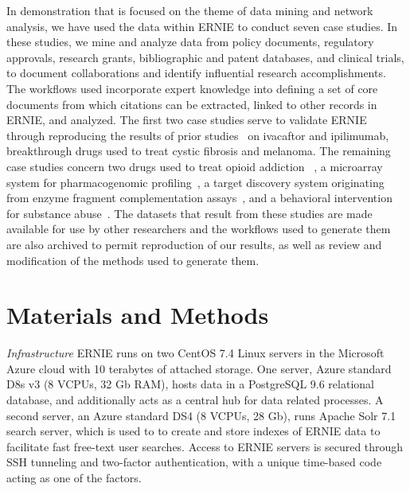 \documentclass[review]{elsarticle}
\begin{document}
In demonstration that is focused on the theme of data mining and network analysis, we have used the data within ERNIE to conduct seven case studies. In these studies, we mine and analyze data from policy documents, regulatory approvals, research grants, bibliographic and patent databases, and clinical trials, to document collaborations and identify influential research accomplishments. The workflows used incorporate expert knowledge into defining a set of core documents from which citations can be extracted, linked to other records in ERNIE, and analyzed. The first two case studies serve to validate ERNIE through reproducing the results of prior studies~\cite{Williams2015} on ivacaftor and ipilimumab, breakthrough drugs used to treat cystic fibrosis and melanoma. The remaining case studies concern two drugs used to treat opioid addiction~\cite{Blumberg1973,Cowan1977} , a microarray system for pharmacogenomic profiling~\cite{deLeon2006}, a target discovery system originating from enzyme fragment complementation assays~\cite{Khanna1989}, and a behavioral intervention for substance abuse~\cite{Botvin1980}. The datasets that result from these studies are made available for use by other researchers and the workflows used to generate them are also archived to permit reproduction of our results, as well as review and modification of the methods used to generate them.

\section*{Materials and Methods}

\emph{Infrastructure} ERNIE runs on two CentOS 7.4 Linux servers in the Microsoft Azure cloud with 10 terabytes of attached storage. One server, Azure standard D8s v3 (8 VCPUs, 32 Gb RAM), hosts data in a PostgreSQL 9.6 relational database, and additionally acts as a central hub for data related processes. A second server, an Azure standard DS4 (8 VCPUs, 28 Gb), runs Apache Solr 7.1 search server, which is used to to create and store indexes of ERNIE data to facilitate fast free-text user searches. Access to ERNIE servers is secured through SSH tunneling and two-factor authentication, with a unique time-based code acting as one of the factors. 
\end{document}

